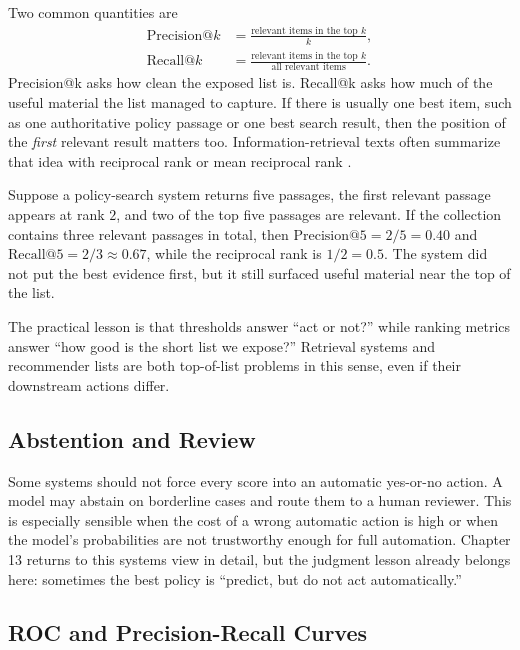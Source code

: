 Two common quantities are
\begin{align*}
\text{Precision@}k &= \frac{\text{relevant items in the top }k}{k}, \\
\text{Recall@}k &= \frac{\text{relevant items in the top }k}{\text{all relevant items}}.
\end{align*}
Precision@k asks how clean the exposed list is. Recall@k asks how much of the useful material the list managed to capture. If there is usually one best item, such as one authoritative policy passage or one best search result, then the position of the \emph{first} relevant result matters too. Information-retrieval texts often summarize that idea with reciprocal rank or mean reciprocal rank \citep{manning2008}.

\begin{example}
Suppose a policy-search system returns five passages, the first relevant passage appears at rank $2$, and two of the top five passages are relevant. If the collection contains three relevant passages in total, then $\text{Precision@}5 = 2/5 = 0.40$ and $\text{Recall@}5 = 2/3 \approx 0.67$, while the reciprocal rank is $1/2 = 0.5$. The system did not put the best evidence first, but it still surfaced useful material near the top of the list.
\end{example}

The practical lesson is that thresholds answer ``act or not?'' while ranking metrics answer ``how good is the short list we expose?'' Retrieval systems and recommender lists are both top-of-list problems in this sense, even if their downstream actions differ.

\subsection{Abstention and Review}

Some systems should not force every score into an automatic yes-or-no action. A model may abstain on borderline cases and route them to a human reviewer. This is especially sensible when the cost of a wrong automatic action is high or when the model's probabilities are not trustworthy enough for full automation. Chapter 13 returns to this systems view in detail, but the judgment lesson already belongs here: sometimes the best policy is ``predict, but do not act automatically.''

\subsection{ROC and Precision-Recall Curves}

